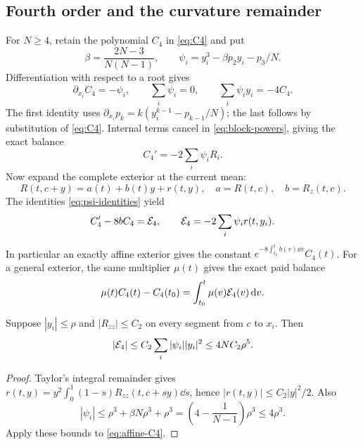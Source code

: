 \subsection{Fourth order and the curvature remainder}
For $N\ge4$, retain the polynomial $C_4$ in \eqref{eq:C4} and put
\begin{equation}
 \beta=\frac{2N-3}{N(N-1)},\qquad
 \psi_i=y_i^3-\beta p_2y_i-p_3/N.
 \label{eq:psi}
\end{equation}
Differentiation with respect to a root gives
\begin{equation}
 \partial_{x_i}C_4=-\psi_i,\qquad
 \sum_i\psi_i=0,\qquad \sum_i\psi_iy_i=-4C_4.
 \label{eq:psi-identities}
\end{equation}
The first identity uses
$\partial_{x_i}p_k=k(y_i^{k-1}-p_{k-1}/N)$; the last follows by
substitution of \eqref{eq:C4}. Internal terms cancel in
\eqref{eq:block-powers}, giving the exact balance
\begin{equation}
 C_4'=-2\sum_i\psi_iR_i.
 \label{eq:C4flux}
\end{equation}
Now expand the complete exterior at the current mean:
\begin{equation}
 R(t,c+y)=a(t)+b(t)y+r(t,y),\quad
 a=R(t,c),\quad b=R_z(t,c).
 \label{eq:affine}
\end{equation}
The identities \eqref{eq:psi-identities} yield
\begin{equation}
 C_4'-8bC_4=\mathcal E_4,\qquad
 \mathcal E_4=-2\sum_i\psi_i r(t,y_i).
 \label{eq:affine-C4}
\end{equation}
In particular an exactly affine exterior gives the constant
$e^{-8\int_{t_0}^t b(v)\dd v}C_4(t)$. For a general exterior,
the same multiplier $\mu(t)$ gives the exact paid balance
\begin{equation}
 \mu(t)C_4(t)-C_4(t_0)=\int_{t_0}^t\mu(v)\mathcal E_4(v)\,\mathrm d v.
 \label{eq:integrated-C4}
\end{equation}

\begin{proposition}
\label{prop:curvature}
Suppose $|y_i|\le\rho$ and $|R_{zz}|\le C_2$ on every segment
from $c$ to $x_i$. Then
\begin{equation}
 |\mathcal E_4|\le C_2\sum_i|\psi_i||y_i|^2\le4NC_2\rho^5.
 \label{eq:curvature}
\end{equation}
\end{proposition}
\begin{proof}
Taylor's integral remainder gives
$r(t,y)=y^2\int_0^1(1-s)R_{zz}(t,c+sy)\dd s$, hence
$|r(t,y)|\le C_2|y|^2/2$. Also
\[
 |\psi_i|\le\rho^3+\beta N\rho^3+\rho^3
          =\left(4-\frac1{N-1}\right)\rho^3\le4\rho^3.
\]
Apply these bounds to \eqref{eq:affine-C4}.
\end{proof}

